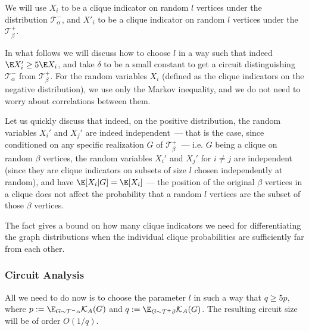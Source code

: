 We will use $X_i$ to be a clique indicator on random $l$ vertices under the distribution $\mathcal{T}^-_{\alpha}$, and $X'_i$ to be a clique indicator on random $l$ vertices under the $\mathcal{T}^+_{\beta}$.

In what follows we will discuss how to choose $l$ in a way such that indeed $\E X_i' \geq 5 \E X_i$, and take $\delta$ to be a small constant to get a circuit distinguishing $\mathcal{T}^-_{\alpha}$ from $\mathcal{T}^+_\beta$. For the random variables $X_i$ (defined as the clique indicators on the negative distribution), we use only the Markov inequality, and we do not need to worry about correlations between them. 

Let us quickly discuss that indeed, on the positive distribution, the random variables $X_i'$ and $X_j'$ are indeed independent~--- that is the case, since conditioned on any specific realization $G$ of $\mathcal{T}^+_{\beta}$~--- i.e. $G$ being a clique on random $\beta$ vertices, the random variables $X_{i}'$ and $X_j'$ for $i\not=j$ are independent (since they are clique indicators on subsets of size $l$ chosen independently at random), and have $\E[X_i | G] = \E [X_i]$ --- the position of the original $\beta$ vertices in a clique does not affect the probability that a random $l$ vertices are the subset of those $\beta$ vertices.

The fact gives a bound on how many clique indicators we need for differentiating the graph distributions when the individual clique probabilities are sufficiently far from each other.

\subsubsection*{Circuit Analysis}

All we need to do now is to choose the parameter $l$ in such a way that $q \geq 5p$, where $p := \E_{G\sim \mathcal{T}^-{\alpha}} \mathcal{K}_A(G)$ and $q := \E_{G\sim \mathcal{T}^+{\beta}} \mathcal{K}_A(G)$. The resulting circuit size will be of order $O(1/q)$.

